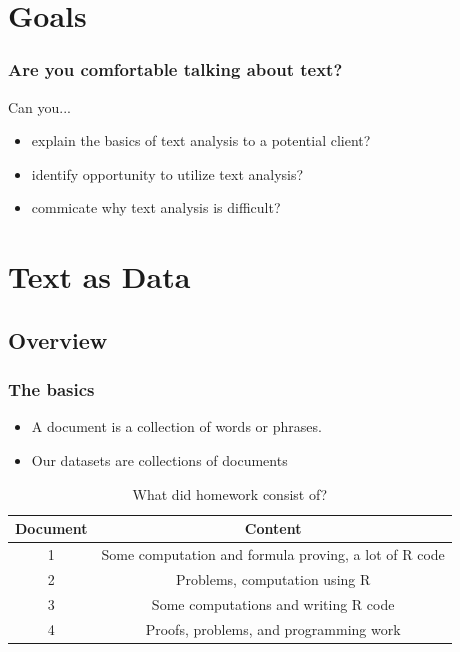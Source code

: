 \documentclass[presentation]{beamer}
\begin{document}
\section{Goals}
\begin{frame}
\frametitle{Are you comfortable talking about text?}
\pause
\begin{block}{Can you...}
\begin{itemize}
\pause
\item explain the basics of text analysis to a potential client?
\pause
\item identify opportunity to utilize text analysis?
\pause
\item commicate why text analysis is difficult?
\end{itemize}
\end{block}
\end{frame}



\section{Text as Data }
\subsection{Overview}
\begin{frame}
 \frametitle{The basics}
 \begin{itemize}
\pause
\item A document is a collection of words or phrases.
\pause
\item Our datasets are collections of documents
\end{itemize}
\pause
\begin{table}[!hbpt]
\caption{What did homework consist of? } \label{tab:title}
\pause
\begin{center}
\begin{tabular} {c c}
\textbf{Document} & \textbf{Content} \\
\hline
1 & Some computation and formula proving, a lot of R code \\
2 & Problems, computation using R \\
3 & Some computations and writing R code\\
4 & Proofs, problems, and programming work \\
\end{tabular}
\end{center}
\end{table}
\end{frame}
\end{document}
